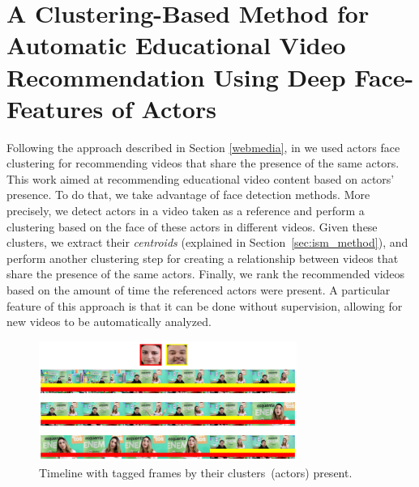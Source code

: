 \section{A Clustering-Based Method for Automatic Educational Video Recommendation Using Deep Face-Features of Actors}

Following the approach described in Section \ref{webmedia}, in \cite{mendes2020ISM} we used actors face clustering for recommending videos that share the presence of the same actors. 
This work aimed at recommending educational video content based on actors' presence.
To do that, we take advantage of face detection methods.
More precisely, we detect actors in a video taken as a reference and perform a clustering based on the face of these actors in different videos.
Given these clusters, we extract their \textit{centroids} (explained in Section~\ref{sec:ism_method}), and perform another clustering step for creating a relationship between videos that share the presence of the same actors.
Finally, we rank the recommended videos based on the amount of time the referenced actors were present.
A particular feature of this approach is that it can be done without supervision, allowing for new videos to be automatically analyzed.


\begin{figure}[!ht]
    \centering
    \includegraphics[width=0.75\textwidth]{img/ism/educational_timeline2.png}
    \caption{Timeline with tagged frames by their clusters~(actors) present.}
    \label{fig:timeline2}
\end{figure}





